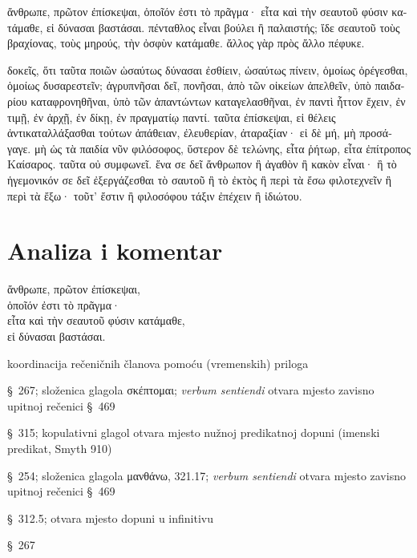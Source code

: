 {\large

\begin{greek}

\noindent ἄνθρωπε, πρῶτον ἐπίσκεψαι, ὁποῖόν ἐστι τὸ πρᾶγμα· εἶτα καὶ τὴν σεαυτοῦ φύσιν κατάμαθε, εἰ δύνασαι βαστάσαι. πένταθλος εἶναι βούλει ἢ παλαιστής; ἴδε σεαυτοῦ τοὺς βραχίονας, τοὺς μηρούς, τὴν ὀσφὺν κατάμαθε. ἄλλος γὰρ πρὸς ἄλλο πέφυκε. 

δοκεῖς, ὅτι ταῦτα ποιῶν ὡσαύτως δύνασαι ἐσθίειν, ὡσαύτως πίνειν, ὁμοίως ὀρέγεσθαι, ὁμοίως δυσαρεστεῖν; ἀγρυπνῆσαι δεῖ, πονῆσαι, ἀπὸ τῶν οἰκείων ἀπελθεῖν, ὑπὸ παιδαρίου καταφρονηθῆναι, ὑπὸ τῶν ἀπαντώντων καταγελασθῆναι, ἐν παντὶ ἧττον ἔχειν, ἐν τιμῇ, ἐν ἀρχῇ, ἐν δίκῃ, ἐν πραγματίῳ παντί. ταῦτα ἐπίσκεψαι, εἰ θέλεις ἀντικαταλλάξασθαι τούτων ἀπάθειαν, ἐλευθερίαν, ἀταραξίαν· εἰ δὲ μή, μὴ προσάγαγε. μὴ ὡς τὰ παιδία νῦν φιλόσοφος, ὕστερον δὲ τελώνης, εἶτα ῥήτωρ, εἶτα ἐπίτροπος Καίσαρος. ταῦτα οὐ συμφωνεῖ. ἕνα σε δεῖ ἄνθρωπον ἢ ἀγαθὸν ἢ κακὸν εἶναι· ἢ τὸ ἡγεμονικόν σε δεῖ ἐξεργάζεσθαι τὸ σαυτοῦ ἢ τὸ ἐκτὸς ἢ περὶ τὰ ἔσω φιλοτεχνεῖν ἢ περὶ τὰ ἔξω· τοῦτ' ἔστιν ἢ φιλοσόφου τάξιν ἐπέχειν ἢ ἰδιώτου.

\end{greek}

}


\section*{Analiza i komentar}


{\large
\begin{greek}
\noindent ἄνθρωπε, πρῶτον ἐπίσκεψαι, \\
\tabto{2em} ὁποῖόν ἐστι τὸ πρᾶγμα· \\
εἶτα καὶ τὴν σεαυτοῦ φύσιν κατάμαθε, \\
\tabto{2em} εἰ δύνασαι βαστάσαι.\\

\end{greek}
}

\begin{description}[noitemsep]
\item[πρῶτον\dots\ εἶτα\dots] koordinacija rečeničnih članova pomoću (vremenskih) priloga
\item[ἐπίσκεψαι] §~267; složenica glagola σκέπτομαι; \textit{verbum sentiendi} otvara mjesto zavisno upitnoj rečenici §~469
\item[ὁποῖόν ἐστι] §~315; kopulativni glagol otvara mjesto nužnoj predikatnoj dopuni (imenski predikat, Smyth 910)
\item[κατάμαθε] §~254; složenica glagola μανθάνω, 321.17; \textit{verbum sentiendi} otvara mjesto zavisno upitnoj rečenici §~469
\item[εἰ δύνασαι] §~312.5; otvara mjesto dopuni u infinitivu
\item[βαστάσαι] §~267
\end{description}

